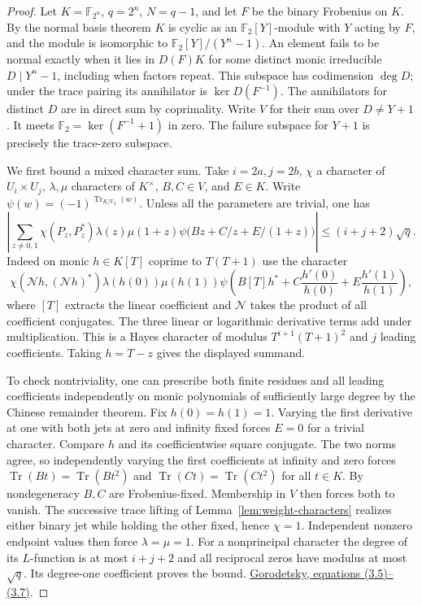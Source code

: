 \documentclass[11pt]{article}
\newcommand{\F}{\mathbb F_2}
\begin{document}
\begin{proof}
Let \(K=\mathbb F_{2^n}\), \(q=2^n\), \(N=q-1\), and let \(F\) be the
binary Frobenius on \(K\). By the normal basis theorem \(K\) is cyclic
as an \(\F[Y]\)-module with \(Y\) acting by \(F\), and the module is
isomorphic to \(\F[Y]/(Y^n-1)\). An element fails to be normal exactly
when it lies in \(D(F)K\) for some distinct monic irreducible
\(D\mid Y^n-1\), including when factors repeat. This subspace has
codimension \(\deg D\); under the trace pairing its annihilator is
\(\ker D(F^{-1})\). The annihilators for distinct \(D\) are in direct
sum by coprimality. Write \(V\) for their sum over \(D\ne Y+1\).
It meets \(\F=\ker(F^{-1}+1)\) in zero.
The failure subspace for \(Y+1\) is precisely the trace-zero subspace.

We first bound a mixed character sum. Take \(i=2a,j=2b\),
\(\chi\) a character of \(U_i\times U_j\),
\(\lambda,\mu\) characters of \(K^\times\), \(B,C\in V\), and \(E\in K\).
Write \(\psi(w)=(-1)^{\operatorname{Tr}_{K/\F}(w)}\).
Unless all the parameters are trivial, one has
\[
 \left|\sum_{z\ne0,1}\chi(P_z,P_z^*)\lambda(z)\mu(1+z)
       \psi\big(Bz+C/z+E/(1+z)\big)\right|\le(i+j+2)\sqrt q.
\]
Indeed on monic \(h\in K[T]\) coprime to \(T(T+1)\) use the character
\[
 \chi(\mathcal Nh,(\mathcal Nh)^*)\lambda(h(0))\mu(h(1))
 \psi\!\left(B[T]h^*+C\frac{h'(0)}{h(0)}+
                         E\frac{h'(1)}{h(1)}\right),
\]
where \([T]\) extracts the linear coefficient and \(\mathcal N\) takes
the product of all coefficient conjugates. The three linear or
logarithmic derivative terms add under multiplication. This is a
Hayes character of modulus \(T^{i+1}(T+1)^2\) and \(j\) leading
coefficients. Taking \(h=T-z\) gives the displayed summand.

To check nontriviality, one can prescribe both finite residues and
all leading coefficients independently on monic polynomials of
sufficiently large degree by the Chinese remainder theorem. Fix
\(h(0)=h(1)=1\). Varying the first derivative at one with both jets
at zero and infinity fixed forces \(E=0\) for a trivial character.
Compare \(h\) and its coefficientwise square conjugate.
The two norms agree, so independently varying the first coefficients
at infinity and zero forces \(\operatorname{Tr}(Bt)=\operatorname{Tr}(Bt^2)\)
and \(\operatorname{Tr}(Ct)=\operatorname{Tr}(Ct^2)\) for all \(t\in K\).
By nondegeneracy \(B,C\) are Frobenius-fixed. Membership in \(V\)
then forces both to vanish. The successive trace lifting of
Lemma~\ref{lem:weight-characters} realizes either binary jet while
holding the other fixed, hence \(\chi=1\). Independent nonzero endpoint
values then force \(\lambda=\mu=1\). For a nonprincipal character the
degree of its \(L\)-function is at most \(i+j+2\) and all reciprocal
zeros have modulus at most \(\sqrt q\). Its degree-one coefficient
proves the bound.
\href{https://arxiv.org/pdf/1810.00483\#page=7}{Gorodetsky,
equations (3.5)--(3.7)}.


\end{proof}
\end{document}
